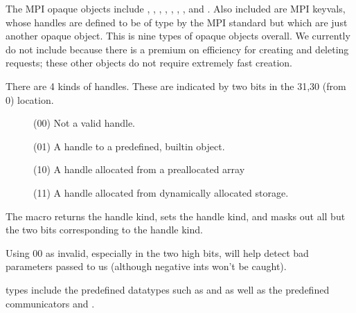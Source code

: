 \documentclass{article}
\begin{document}
The MPI opaque objects include , ,
, , ,
, , and .  
Also included are MPI keyvals, whose handles are defined to be of type
 by the MPI standard but which are just another opaque
object.
This is nine types of opaque objects overall.
We
currently do not include  because there is a
premium on efficiency for creating and deleting requests; these other
objects do not require extremely fast creation.



There are 4 kinds of handles.  These are indicated by two bits in the
31,30 (from 0) location.
\begin{description}
\item[] (00) Not a valid handle.
\item[] (01) A handle to a predefined,
builtin object. 
\item[] (10) A handle allocated from a
preallocated array 
\item[] (11) A handle allocated from dynamically
allocated storage.
\end{description}
The macro  returns the handle kind,
 sets the handle kind, and
 masks out all but the two bits
corresponding to the handle kind.


Using $00$ as invalid, especially in the two high bits, will help detect
bad parameters passed to us (although negative ints won't be caught).

 types include the predefined datatypes such as
 and  as well as the predefined communicators
 and .
\end{document}
